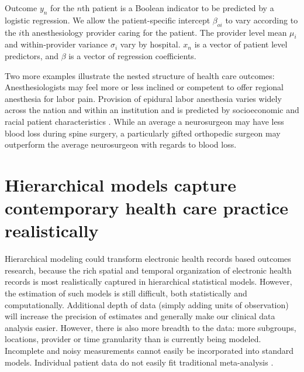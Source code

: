 \documentclass[11pt,notitlepage]{article}
\begin{document}
Outcome $y_n$ for the $n$th patient is a Boolean indicator to be predicted by a logistic regression. We allow the patient-specific
intercept $\beta_{oi}$ to vary according to the $i$th anesthesiology provider caring for the patient. The provider level mean 
$\mu_i$ and within-provider variance $\sigma_i$ vary by hospital. $x_n$ is a vector of patient level predictors, and $\beta$ is a vector 
of regression coefficients.  

Two more examples illustrate the nested structure of health care outcomes: 
Anesthesiologists may feel more or less inclined or competent to offer 
regional anesthesia for labor pain. Provision of epidural labor 
anesthesia varies widely across the nation and within an institution and 
is predicted by socioeconomic and racial patient characteristics 
\cite{Rust2004,Glance2007}.  
While an average a neurosurgeon may have less blood loss during spine 
surgery, a particularly gifted orthopedic surgeon may outperform the 
average neurosurgeon with regards to blood loss.

\section*{Hierarchical models capture contemporary health care practice realistically}
Hierarchical modeling could transform electronic health records based 
outcomes research, because the rich spatial and temporal 
organization of electronic health records is most realistically 
captured in hierarchical statistical models. However, the estimation of such models
is still difficult, both statistically and computationally.  
Additional depth of data (simply adding units of observation) will increase 
the precision of estimates and generally make our clinical data analysis easier. 
However, there is also more breadth to the data: 
more subgroups, locations, provider or time granularity than is currently 
being modeled. Incomplete and noisy measurements cannot easily be incorporated into standard models.
Individual patient data do not easily fit traditional meta-analysis
\cite{Andreae2015,Andreae2012}.
\end{document}
